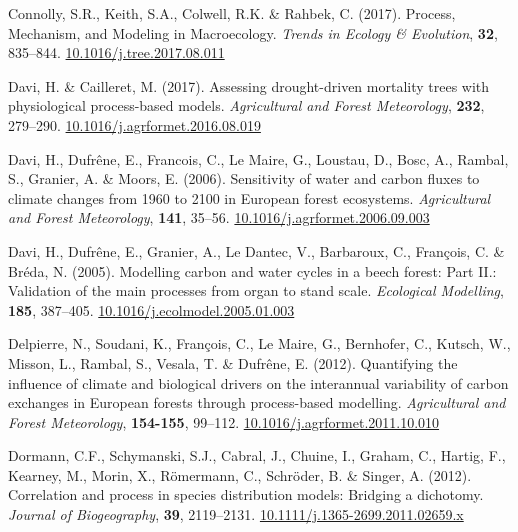 \documentclass[11pt,]{article}
\newlength{\cslhangindent}
\newenvironment{CSLReferences}[2] %
 {%
  \setlength{\parindent}{0pt}
  \ifodd #1 \everypar{\setlength{\hangindent}{\cslhangindent}}\ignorespaces\fi
  \ifnum #2 > 0
  \setlength{\parskip}{#2\baselineskip}
  \fi
 }%
 {}
\begin{document}
\begin{CSLReferences}{1}{0}
\leavevmode{}%
Connolly, S.R., Keith, S.A., Colwell, R.K. \& Rahbek, C. (2017).
Process, {Mechanism}, and {Modeling} in {Macroecology}. \emph{Trends in
Ecology \& Evolution}, \textbf{32}, 835--844.
\href{https://doi.org/10.1016/j.tree.2017.08.011}{10.1016/j.tree.2017.08.011}

\leavevmode{}%
Davi, H. \& Cailleret, M. (2017). Assessing drought-driven mortality
trees with physiological process-based models. \emph{Agricultural and
Forest Meteorology}, \textbf{232}, 279--290.
\href{https://doi.org/10.1016/j.agrformet.2016.08.019}{10.1016/j.agrformet.2016.08.019}

\leavevmode{}%
Davi, H., Dufrêne, E., Francois, C., Le Maire, G., Loustau, D., Bosc,
A., Rambal, S., Granier, A. \& Moors, E. (2006). Sensitivity of water
and carbon fluxes to climate changes from 1960 to 2100 in {European}
forest ecosystems. \emph{Agricultural and Forest Meteorology},
\textbf{141}, 35--56.
\href{https://doi.org/10.1016/j.agrformet.2006.09.003}{10.1016/j.agrformet.2006.09.003}

\leavevmode{}%
Davi, H., Dufrêne, E., Granier, A., Le Dantec, V., Barbaroux, C.,
François, C. \& Bréda, N. (2005). Modelling carbon and water cycles in a
beech forest: {Part} {II}.: {Validation} of the main processes from
organ to stand scale. \emph{Ecological Modelling}, \textbf{185},
387--405.
\href{https://doi.org/10.1016/j.ecolmodel.2005.01.003}{10.1016/j.ecolmodel.2005.01.003}

\leavevmode{}%
Delpierre, N., Soudani, K., François, C., Le Maire, G., Bernhofer, C.,
Kutsch, W., Misson, L., Rambal, S., Vesala, T. \& Dufrêne, E. (2012).
Quantifying the influence of climate and biological drivers on the
interannual variability of carbon exchanges in {European} forests
through process-based modelling. \emph{Agricultural and Forest
Meteorology}, \textbf{154-155}, 99--112.
\href{https://doi.org/10.1016/j.agrformet.2011.10.010}{10.1016/j.agrformet.2011.10.010}

\leavevmode{}%
Dormann, C.F., Schymanski, S.J., Cabral, J., Chuine, I., Graham, C.,
Hartig, F., Kearney, M., Morin, X., Römermann, C., Schröder, B. \&
Singer, A. (2012). Correlation and process in species distribution
models: Bridging a dichotomy. \emph{Journal of Biogeography},
\textbf{39}, 2119--2131.
\href{https://doi.org/10.1111/j.1365-2699.2011.02659.x}{10.1111/j.1365-2699.2011.02659.x}


\end{CSLReferences}
\end{document}
